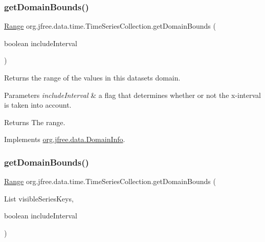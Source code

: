\subsubsection{\texorpdfstring{get\+Domain\+Bounds()}{getDomainBounds()}\hspace{0.1cm}{\footnotesize\ttfamily [1/2]}}
{\footnotesize\ttfamily \mbox{\hyperlink{classorg_1_1jfree_1_1data_1_1_range}{Range}} org.\+jfree.\+data.\+time.\+Time\+Series\+Collection.\+get\+Domain\+Bounds (\begin{DoxyParamCaption}\item[{boolean}]{include\+Interval }\end{DoxyParamCaption})}

Returns the range of the values in this dataset\textquotesingle{}s domain.


\begin{DoxyParams}{Parameters}
{\em include\+Interval} & a flag that determines whether or not the x-\/interval is taken into account.\\
\hline
\end{DoxyParams}
\begin{DoxyReturn}{Returns}
The range. 
\end{DoxyReturn}


Implements \mbox{\hyperlink{interfaceorg_1_1jfree_1_1data_1_1_domain_info_aeb90c8bc6d27c82c39abc99622846732}{org.\+jfree.\+data.\+Domain\+Info}}.

\mbox{\label{classorg_1_1jfree_1_1data_1_1time_1_1_time_series_collection_ac13a6953fa601e775d100b576c73f052}} 
\subsubsection{\texorpdfstring{get\+Domain\+Bounds()}{getDomainBounds()}\hspace{0.1cm}{\footnotesize\ttfamily [2/2]}}
{\footnotesize\ttfamily \mbox{\hyperlink{classorg_1_1jfree_1_1data_1_1_range}{Range}} org.\+jfree.\+data.\+time.\+Time\+Series\+Collection.\+get\+Domain\+Bounds (\begin{DoxyParamCaption}\item[{List}]{visible\+Series\+Keys,  }\item[{boolean}]{include\+Interval }\end{DoxyParamCaption})}


